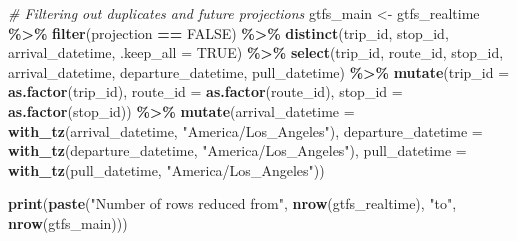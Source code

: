 \documentclass[
  12pt,
]{article}
\newenvironment{Shaded}{\begin{snugshade}}{\end{snugshade}}
\newcommand{\AttributeTok}[1]{\textcolor[rgb]{0.13,0.29,0.53}{#1}}
\newcommand{\CommentTok}[1]{\textcolor[rgb]{0.56,0.35,0.01}{\textit{#1}}}
\newcommand{\ConstantTok}[1]{\textcolor[rgb]{0.56,0.35,0.01}{#1}}
\newcommand{\FunctionTok}[1]{\textcolor[rgb]{0.13,0.29,0.53}{\textbf{#1}}}
\newcommand{\NormalTok}[1]{#1}
\newcommand{\OtherTok}[1]{\textcolor[rgb]{0.56,0.35,0.01}{#1}}
\newcommand{\SpecialCharTok}[1]{\textcolor[rgb]{0.81,0.36,0.00}{\textbf{#1}}}
\newcommand{\StringTok}[1]{\textcolor[rgb]{0.31,0.60,0.02}{#1}}
\begin{document}
\begin{Shaded}
\begin{Highlighting}[]
\CommentTok{\# Filtering out duplicates and future projections}
\NormalTok{gtfs\_main }\OtherTok{\textless{}{-}}\NormalTok{ gtfs\_realtime }\SpecialCharTok{\%\textgreater{}\%}
  \FunctionTok{filter}\NormalTok{(projection }\SpecialCharTok{==} \ConstantTok{FALSE}\NormalTok{) }\SpecialCharTok{\%\textgreater{}\%}
  \FunctionTok{distinct}\NormalTok{(trip\_id, stop\_id, arrival\_datetime, }\AttributeTok{.keep\_all =} \ConstantTok{TRUE}\NormalTok{) }\SpecialCharTok{\%\textgreater{}\%}
  \FunctionTok{select}\NormalTok{(trip\_id, route\_id, stop\_id, arrival\_datetime, departure\_datetime, }
\NormalTok{         pull\_datetime) }\SpecialCharTok{\%\textgreater{}\%}
  \FunctionTok{mutate}\NormalTok{(}\AttributeTok{trip\_id =} \FunctionTok{as.factor}\NormalTok{(trip\_id),}
         \AttributeTok{route\_id =} \FunctionTok{as.factor}\NormalTok{(route\_id),}
         \AttributeTok{stop\_id =} \FunctionTok{as.factor}\NormalTok{(stop\_id)) }\SpecialCharTok{\%\textgreater{}\%}
  \FunctionTok{mutate}\NormalTok{(}\AttributeTok{arrival\_datetime =} \FunctionTok{with\_tz}\NormalTok{(arrival\_datetime, }\StringTok{"America/Los\_Angeles"}\NormalTok{),}
         \AttributeTok{departure\_datetime =} \FunctionTok{with\_tz}\NormalTok{(departure\_datetime, }\StringTok{"America/Los\_Angeles"}\NormalTok{),}
         \AttributeTok{pull\_datetime =} \FunctionTok{with\_tz}\NormalTok{(pull\_datetime, }\StringTok{"America/Los\_Angeles"}\NormalTok{))}

\FunctionTok{print}\NormalTok{(}\FunctionTok{paste}\NormalTok{(}\StringTok{"Number of rows reduced from"}\NormalTok{, }\FunctionTok{nrow}\NormalTok{(gtfs\_realtime), }\StringTok{"to"}\NormalTok{, }
            \FunctionTok{nrow}\NormalTok{(gtfs\_main)))}
\end{Highlighting}
\end{Shaded}
\end{document}
